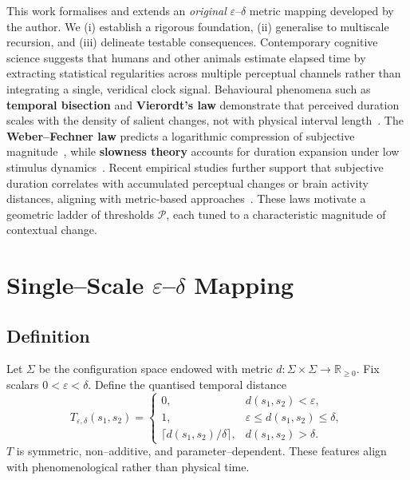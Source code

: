 \documentclass[preprint,11pt]{elsarticle}
\newcommand{\R}{\mathbb{R}}
\begin{document}
This work formalises and extends an \emph{original}
$\varepsilon$--$\delta$ metric mapping developed by the author.  We
(i) establish a rigorous foundation, (ii) generalise to multiscale
recursion, and (iii) delineate testable consequences.  Contemporary
cognitive science suggests that humans and other animals estimate
elapsed time by extracting statistical regularities across multiple
perceptual channels rather than integrating a single, veridical clock
signal.  Behavioural phenomena such as \textbf{temporal bisection} and
\textbf{Vierordt's law} demonstrate that perceived duration scales
with the density of salient changes, not with physical interval
length~\citep{block1990distinguishing,church1984human}.  The
\textbf{Weber--Fechner law} predicts a logarithmic compression of
subjective magnitude~\citep{fechner1860},
while \textbf{slowness theory} accounts for duration expansion under
low stimulus dynamics~\citep{watanabe85perceptual}. Recent empirical
studies further support that subjective duration correlates with accumulated
perceptual changes or brain activity distances, aligning with metric-based
approaches~\citep{Roseboom2019,Sherman2022}. These laws
motivate a geometric ladder of thresholds $\mathcal P$, each tuned to
a characteristic magnitude of contextual change.

\section{Single--Scale $\varepsilon$--$\delta$ Mapping}
\subsection{Definition}
Let $\Sigma$ be the configuration space endowed with metric
$d:\Sigma\times\Sigma\to\R_{\ge 0}$.  Fix scalars
$0<\varepsilon<\delta$.  Define the quantised temporal distance
\begin{equation}
T_{\varepsilon,\delta}(s_1,s_2)=
\begin{cases}
0, & d(s_1,s_2)<\varepsilon,\\
1, & \varepsilon\le d(s_1,s_2)\le\delta,\\
\bigl\lceil d(s_1,s_2)/\delta \bigr\rceil, & d(s_1,s_2)>\delta.
\end{cases}
\label{eq:single_scale_T}
\end{equation}
$T$ is symmetric, non--additive, and parameter--dependent.  These
features align with phenomenological rather than physical time.
\end{document}
